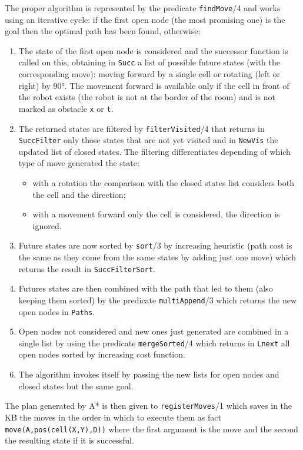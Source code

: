 The proper algorithm is represented by the predicate \texttt{findMove}/4 and works using an iterative cycle: if the first open node (the most promising one) is the goal then the optimal path has been found, otherwise:
\begin{enumerate}
	\item The state of the first open node is considered and the successor function is called on this, obtaining in \texttt{Succ} a list of possible future states (with the corresponding move): moving forward by a single cell or rotating (left or right) by \ang{90}. The movement forward is available only if the cell in front of the robot exists (the robot is not at the border of the room) and is not marked as obstacle \texttt{x} or \texttt{t}.
	\item The returned states are filtered by \texttt{filterVisited}/4 that returns in \texttt{SuccFilter} only those states that are not yet visited and in \texttt{NewVis} the updated list of closed states. The filtering differentiates depending of which type of move generated the state:
	\begin{itemize}
		\item with a rotation the comparison with the closed states list considers both the cell and the direction;
		\item with a movement forward only the cell is considered, the direction is ignored.
	\end{itemize}
	\item Future states are now sorted by \texttt{sort}/3 by increasing heuristic (path cost is the same as they come from the same states by adding just one move) which returns the result in \texttt{SuccFilterSort}.
	\item Futures states are then combined with the path that led to them (also keeping them sorted) by the predicate \texttt{multiAppend}/3 which returns the new open nodes in \texttt{Paths}.
	\item Open nodes not considered and new ones just generated are combined in a single list by using the predicate \texttt{mergeSorted}/4 which returns in \texttt{Lnext} all open nodes sorted by increasing cost function.
	\item The algorithm invokes itself by passing the new lists for open nodes and closed states but the same goal.
\end{enumerate}

The plan generated by A* is then given to \texttt{registerMoves}/1 which saves in the KB the moves in the order in which to execute them as fact \texttt{move(A,pos(cell(X,Y),D))} where the first argument is the move and the second the resulting state if it is successful.

